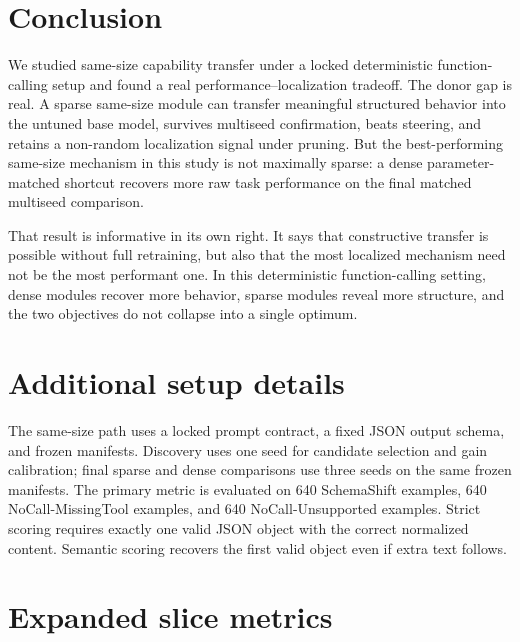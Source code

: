 \documentclass{article}
\begin{document}
\section{Conclusion}
We studied same-size capability transfer under a locked deterministic function-calling setup and found a real performance--localization tradeoff. The donor gap is real. A sparse same-size module can transfer meaningful structured behavior into the untuned base model, survives multiseed confirmation, beats steering, and retains a non-random localization signal under pruning. But the best-performing same-size mechanism in this study is not maximally sparse: a dense parameter-matched shortcut recovers more raw task performance on the final matched multiseed comparison.

That result is informative in its own right. It says that constructive transfer is possible without full retraining, but also that the most localized mechanism need not be the most performant one. In this deterministic function-calling setting, dense modules recover more behavior, sparse modules reveal more structure, and the two objectives do not collapse into a single optimum.




\appendix
\section{Additional setup details}
The same-size path uses a locked prompt contract, a fixed JSON output schema, and frozen manifests. Discovery uses one seed for candidate selection and gain calibration; final sparse and dense comparisons use three seeds on the same frozen manifests. The primary metric is evaluated on 640 SchemaShift examples, 640 NoCall-MissingTool examples, and 640 NoCall-Unsupported examples. Strict scoring requires exactly one valid JSON object with the correct normalized content. Semantic scoring recovers the first valid object even if extra text follows.

\section{Expanded slice metrics}
\begin{table}[H]
\centering
\caption{Strict and semantic results on the primary slices. These numbers explain why the paper avoids a broad semantic-transfer claim: aggregate gains do not come from SchemaShift strict success.}
\label{tab:appendix-slices}
\small

\end{table}
\end{document}
